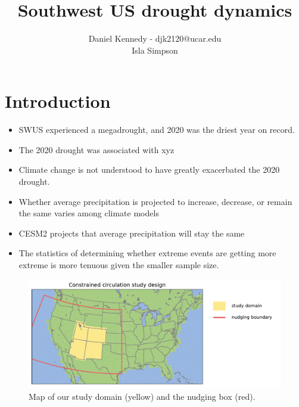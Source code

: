 \documentclass[11pt]{article}
\title{Southwest US drought dynamics \large \\}
\author{Daniel Kennedy - djk2120@ucar.edu \\ Isla Simpson }
\begin{document}
\maketitle

\section{Introduction}

\begin{itemize}
    \item SWUS experienced a megadrought, and 2020 was the driest year on record.
    \item The 2020 drought was associated with xyz
    \item Climate change is not understood to have greatly exacerbated the 2020 drought.
    \item Whether average precipitation is projected to increase, decrease, or remain the same varies among climate models
    \item CESM2 projects that average precipitation will stay the same
    \item The statistics of determining whether extreme events are getting more extreme is more tenuous given the smaller sample size.
\end{itemize}


\begin{figure}[h]
\centering
\includegraphics[width=40pc]{figs/domain.pdf}
\caption{Map of our study domain (yellow) and the nudging box (red).}
\label{fig:domain}
\end{figure}


\newpage
\end{document}
